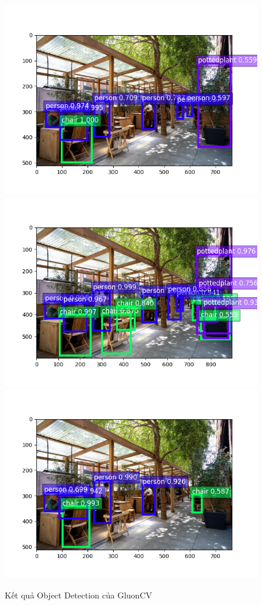 \begin{figure}
    \centering
    \includegraphics[scale=0.35]{../code/processed/gluon_ssd.png}\includegraphics[scale=0.35]{../code/processed/gluon_faster_rcnn.png}\includegraphics[scale=0.35]{../code/processed/gluon_yolo3.png}
    \caption{Kết quả Object Detection của GluonCV}
    \label{fig:gluoncv-detection}
\end{figure}


